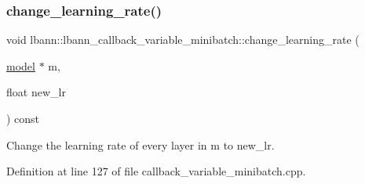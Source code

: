 \subsubsection{\texorpdfstring{change\+\_\+learning\+\_\+rate()}{change\_learning\_rate()}}
{\footnotesize\ttfamily void lbann\+::lbann\+\_\+callback\+\_\+variable\+\_\+minibatch\+::change\+\_\+learning\+\_\+rate (\begin{DoxyParamCaption}\item[{\hyperlink{classlbann_1_1model}{model} $\ast$}]{m,  }\item[{float}]{new\+\_\+lr }\end{DoxyParamCaption}) const\hspace{0.3cm}{\ttfamily [protected]}}



Change the learning rate of every layer in m to new\+\_\+lr. 



Definition at line 127 of file callback\+\_\+variable\+\_\+minibatch.\+cpp.


